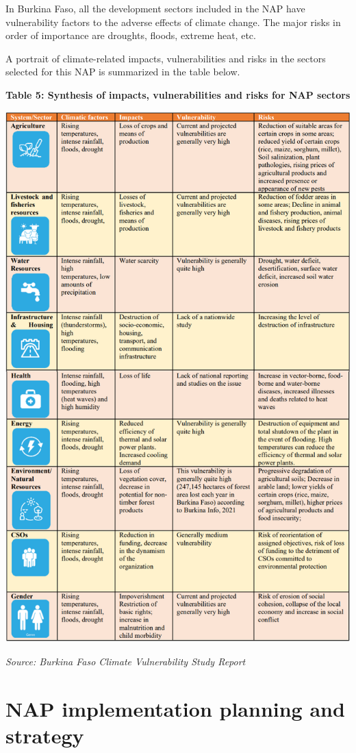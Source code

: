 \documentclass[
]{book}
\begin{document}
In Burkina Faso, all the development sectors included in the NAP have vulnerability factors to the adverse effects of climate change. The major risks in order of importance are droughts, floods, extreme heat, etc.

A portrait of climate-related impacts, vulnerabilities and risks in the sectors selected for this NAP is summarized in the table below.

\textbf{Table 5: Synthesis of impacts, vulnerabilities and risks for NAP sectors}

\includegraphics{Tables/Table 5.PNG}

\emph{Source: Burkina Faso Climate Vulnerability Study Report}

\chapter{NAP implementation planning and strategy}\label{nap-implementation-planning-and-strategy}
\end{document}

